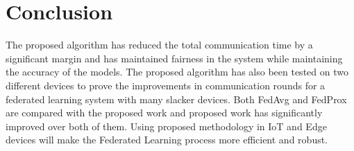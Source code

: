 \documentclass[conference]{IEEEtran}
\begin{document}
\section{Conclusion}
The proposed algorithm has reduced the total communication time by a significant margin and has maintained fairness in the system while maintaining the accuracy of the models. The proposed algorithm has also been tested on two different devices to prove the improvements in communication rounds for a federated learning system with many slacker devices. Both FedAvg and FedProx are compared with the proposed work and proposed work has significantly improved over both of them. Using proposed methodology in IoT and Edge devices will make the Federated Learning process more efficient and robust.


\end{document}
